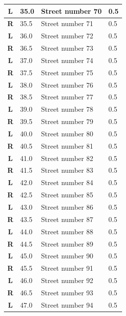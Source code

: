 \documentclass[11pt]{article}
\begin{document}
\begin{center}
\begin{supertabular}{|c|p{0.30in}|p{2.25in}|l|}
 \textbf{L} &  35.0 & Street number 70 &   0.5 \\ \hline
{} \textbf{R} &  35.5 & Street number 71 &   0.5 \\ \hline
 \textbf{L} &  36.0 & Street number 72 &   0.5 \\ \hline
{} \textbf{R} &  36.5 & Street number 73 &   0.5 \\ \hline
 \textbf{L} &  37.0 & Street number 74 &   0.5 \\ \hline
{} \textbf{R} &  37.5 & Street number 75 &   0.5 \\ \hline
 \textbf{L} &  38.0 & Street number 76 &   0.5 \\ \hline
{} \textbf{R} &  38.5 & Street number 77 &   0.5 \\ \hline
 \textbf{L} &  39.0 & Street number 78 &   0.5 \\ \hline
{} \textbf{R} &  39.5 & Street number 79 &   0.5 \\ \hline
 \textbf{L} &  40.0 & Street number 80 &   0.5 \\ \hline
{} \textbf{R} &  40.5 & Street number 81 &   0.5 \\ \hline
 \textbf{L} &  41.0 & Street number 82 &   0.5 \\ \hline
{} \textbf{R} &  41.5 & Street number 83 &   0.5 \\ \hline
 \textbf{L} &  42.0 & Street number 84 &   0.5 \\ \hline
{} \textbf{R} &  42.5 & Street number 85 &   0.5 \\ \hline
 \textbf{L} &  43.0 & Street number 86 &   0.5 \\ \hline
{} \textbf{R} &  43.5 & Street number 87 &   0.5 \\ \hline
 \textbf{L} &  44.0 & Street number 88 &   0.5 \\ \hline
{} \textbf{R} &  44.5 & Street number 89 &   0.5 \\ \hline
 \textbf{L} &  45.0 & Street number 90 &   0.5 \\ \hline
{} \textbf{R} &  45.5 & Street number 91 &   0.5 \\ \hline
 \textbf{L} &  46.0 & Street number 92 &   0.5 \\ \hline
{} \textbf{R} &  46.5 & Street number 93 &   0.5 \\ \hline
 \textbf{L} &  47.0 & Street number 94 &   0.5 \\ \hline

\end{supertabular}
\end{center}
\end{document}
